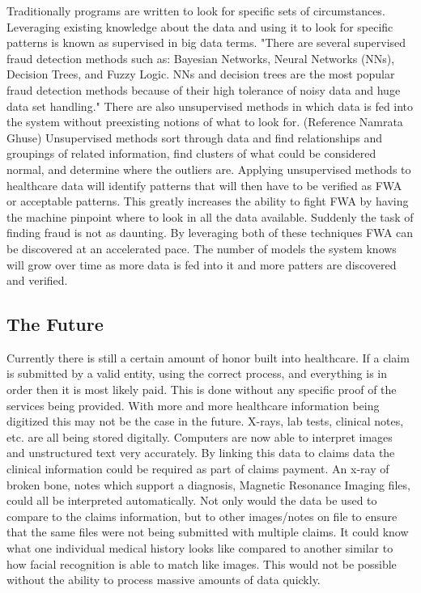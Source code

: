 \documentclass[sigconf]{acmart}
\begin{document}
Traditionally programs are written to look for specific sets of circumstances.  Leveraging existing knowledge about the data and using it to look for specific patterns is known as supervised in big data terms.  "There are several supervised fraud detection methods such as: Bayesian Networks, Neural Networks (NNs), Decision Trees, and Fuzzy Logic. NNs and decision trees are the most popular fraud detection methods because of their high tolerance of noisy data and huge data set handling."  There are also unsupervised methods in which data is fed into the system without preexisting notions of what to look for.  (Reference Namrata Ghuse)  Unsupervised methods sort through data and find relationships and groupings of related information, find clusters of what could be considered normal, and determine where the outliers are.  Applying unsupervised methods to healthcare data will identify patterns that will then have to be verified as FWA or acceptable patterns.  This greatly increases the ability to fight FWA by having the machine pinpoint where to look in all the data available.  Suddenly the task of finding fraud is not as daunting.  By leveraging both of these techniques FWA can be discovered at an accelerated pace.  The number of models the system knows will grow over time as more data is fed into it and more patters are discovered and verified.

\subsection{The Future}

Currently there is still a certain amount of honor built into healthcare.  If a claim is submitted by a valid entity, using the correct process, and everything is in order then it is most likely paid.  This is done without any specific proof of the services being provided.  With more and more healthcare information being digitized this may not be the case in the future.  X-rays, lab tests, clinical notes, etc. are all being stored digitally.  Computers are now able to interpret images and unstructured text very accurately.  By linking this data to claims data the clinical information could be required as part of claims payment.  An x-ray of broken bone, notes which support a diagnosis, Magnetic Resonance Imaging files, could all be interpreted automatically.  Not only would the data be used to compare to the claims information, but to other images/notes on file to ensure that the same files were not being submitted with multiple claims.  It could know what one individual medical history looks like compared to another similar to how facial recognition is able to match like images.  This would not be possible without the ability to process massive amounts of data quickly.  
\end{document}
